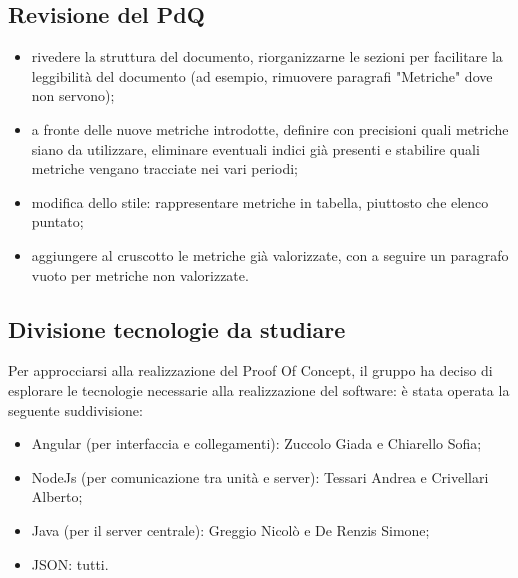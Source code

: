\subsection{Revisione del PdQ}
\begin{itemize}	
	\item rivedere la struttura del documento, riorganizzarne le sezioni per facilitare la leggibilità del documento (ad esempio, rimuovere paragrafi "Metriche" dove non servono);
	\item a fronte delle nuove metriche introdotte, definire con precisioni quali metriche siano da utilizzare, eliminare eventuali indici già presenti e stabilire quali metriche vengano tracciate nei vari periodi;
	\item modifica dello stile: rappresentare metriche in tabella, piuttosto che elenco puntato;
	\item aggiungere al cruscotto le metriche già valorizzate, con a seguire un paragrafo vuoto per metriche non valorizzate.
\end{itemize}

\subsection{Divisione tecnologie da studiare}
Per approcciarsi alla realizzazione del Proof Of Concept, il gruppo ha deciso di esplorare le tecnologie necessarie alla realizzazione del software: è stata operata la seguente suddivisione:
\begin{itemize}
	\item Angular (per interfaccia e collegamenti): Zuccolo Giada e Chiarello Sofia;
	\item NodeJs (per comunicazione tra unità e server): Tessari Andrea e Crivellari Alberto;
	\item Java (per il server centrale): Greggio Nicolò e De Renzis Simone;
	\item JSON: tutti.
\end{itemize}